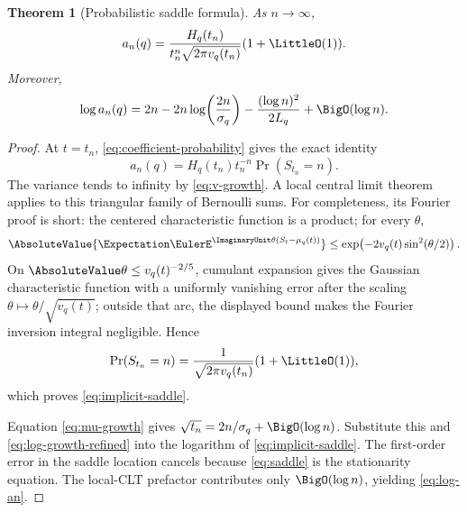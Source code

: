 \documentclass[11pt]{article}
\numberwithin{equation}{section}
\newtheorem{theorem}{Theorem}[section]
\theoremstyle{definition}
\theoremstyle{remark}
\begin{document}
\begin{theorem}[Probabilistic saddle formula]\label{thm:saddle}
As $n\to\infty$,
\begin{equation}\label{eq:implicit-saddle}
 a_n(q)=\frac{H_q(t_n)}{t_n^n\sqrt{2\pi v_q(t_n)}}(1+\LittleO(1)).
\end{equation}
Moreover,
\begin{equation}\label{eq:log-an}
 \log a_n(q)=2n-2n\log\!\left(\frac{2n}{\sigma_q}\right)
 -\frac{(\log n)^2}{2L_q}+\BigO(\log n).
\end{equation}
\end{theorem}
\begin{proof}
At $t=t_n$, \eqref{eq:coefficient-probability} gives the exact identity
\[
 a_n(q)=H_q(t_n)t_n^{-n}\Pr(S_{t_n}=n).
\]
The variance tends to infinity by \eqref{eq:v-growth}.  A local central limit theorem applies to this triangular family of Bernoulli sums.  For completeness, its Fourier proof is short: the centered characteristic function is a product; for every $\theta$,
\[
 \AbsoluteValue{\Expectation\EulerE^{\ImaginaryUnit\theta(S_t-\mu_q(t))}}
 \le\exp\!\left(-2v_q(t)\sin^2(\theta/2)\right).
\]
On $\AbsoluteValue\theta\le v_q(t)^{-2/5}$, cumulant expansion gives the Gaussian characteristic function with a uniformly vanishing error after the scaling $\theta\mapsto\theta/\sqrt{v_q(t)}$; outside that arc, the displayed bound makes the Fourier inversion integral negligible.  Hence
\[
 \Pr(S_{t_n}=n)=\frac{1}{\sqrt{2\pi v_q(t_n)}}(1+\LittleO(1)),
\]
which proves \eqref{eq:implicit-saddle}.

Equation \eqref{eq:mu-growth} gives
$\sqrt{t_n}=2n/\sigma_q+\BigO(\log n)$.  Substitute this and
\eqref{eq:log-growth-refined} into the logarithm of
\eqref{eq:implicit-saddle}.  The first-order error in the saddle location cancels because \eqref{eq:saddle} is the stationarity equation.  The local-CLT prefactor contributes only $\BigO(\log n)$, yielding \eqref{eq:log-an}.
\end{proof}
\end{document}
